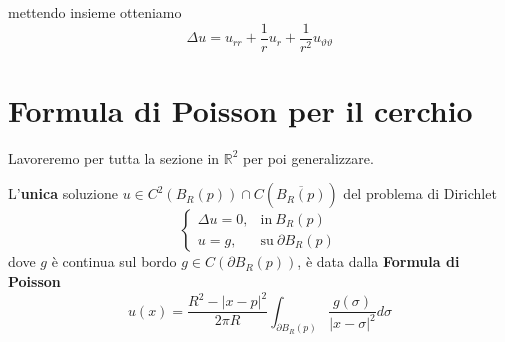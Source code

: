 \documentclass[10pt,a4paper,twoside,openright]{book}
\begin{document}
mettendo insieme otteniamo
\begin{equation*}
\Delta u=u_{rr} +\frac{1}{r} u_{r} +\frac{1}{r^{2}} u_{\vartheta \vartheta }
\end{equation*}
\section{Formula di Poisson per il cerchio}
Lavoreremo per tutta la sezione in $\displaystyle \mathbb{R}^{2}$ per poi generalizzare.
\begin{theorem}
L'\textbf{unica} soluzione $u\in C^{2}(B_{R}(p)) \cap C\left(\overline{B_{R}(p)}\right)$ del problema di Dirichlet
\begin{equation*}
\begin{cases}
\Delta u=0, & \text{in} \ B_{R}(p)\\
u=g, & \text{su} \ \partial B_{R}(p)
\end{cases}
\end{equation*}
dove $g$ è continua sul bordo $g\in C( \partial B_{R}(p))$, è data dalla \textbf{Formula di Poisson}
\begin{equation*}
u(x) =\frac{R^{2} -| x-p| ^{2}}{2\pi R}\int _{\partial B_{R}(p)}\frac{g(\sigma)}{| x-\sigma | ^{2}} d\sigma 
\end{equation*}
\end{theorem}
\end{document}

